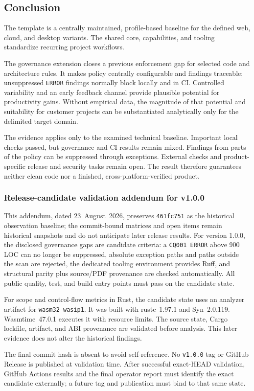 \subsection{Conclusion}
\label{subsec:fazit}

The template is a centrally maintained, profile-based baseline for the defined
web, cloud, and desktop variants. The shared core, capabilities, and tooling
standardize recurring project workflows.

The governance extension closes a previous enforcement gap for selected code
and architecture rules. It makes policy centrally configurable and findings
traceable; unsuppressed \texttt{ERROR} findings normally block locally and in
CI. Controlled variability and an early feedback channel provide plausible
potential for productivity gains. Without empirical data, the magnitude of
that potential and suitability for customer projects can be substantiated
analytically only for the delimited target domain.

The evidence applies only to the examined technical baseline. Important local
checks passed, but governance and CI results remain mixed. Findings from parts
of the policy can be suppressed through exceptions. External checks and
product-specific release and security tasks remain open. The result therefore
guarantees neither clean code nor a finished, cross-platform-verified product.

\subsubsection*{Release-candidate validation addendum for v1.0.0}
\begingroup
\ifbeginnerstatements\fontsize{9pt}{10.8pt}\selectfont\fi
This addendum, dated 23~August~2026, preserves \texttt{461fc751} as the
historical observation baseline; the commit-bound matrices and open items
remain historical snapshots and do not anticipate later release results. For version
1.0.0, the disclosed governance gaps are candidate criteria: a
\texttt{CQ001 ERROR} above 900 LOC can no longer be suppressed,
absolute exception paths and paths outside the scan are rejected, the
dedicated tooling environment provides Ruff, and structural parity plus
source/PDF provenance are checked automatically. All public quality, test, and
build entry points must pass on the candidate state.

For scope and control-flow metrics in Rust, the candidate state uses an analyzer
artifact for \texttt{wasm32-wasip1}. It was built with rustc~1.97.1 and
Syn~2.0.119. Wasmtime~47.0.1 executes it with resource limits. The source
state, Cargo lockfile, artifact, and ABI provenance are validated before
analysis. This later evidence does not alter the historical findings.

The final commit hash is absent to avoid self-reference. No \texttt{v1.0.0}
tag or GitHub Release is published at validation time. After successful
exact-HEAD validation, GitHub Actions results and the final operator report
must identify the exact candidate externally; a future tag and publication
must bind to that same state.
\endgroup
